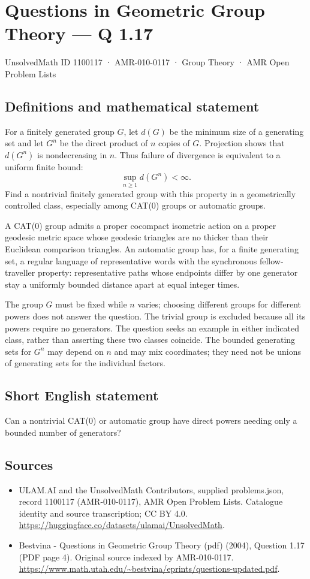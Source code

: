 \documentclass[11pt,a4paper]{article}
\begin{document}
\section*{Questions in Geometric Group Theory — Q 1.17}\label{1100117}
{\small UnsolvedMath ID 1100117 · AMR-010-0117 · Group Theory · AMR Open Problem Lists}
\subsection{Definitions and mathematical statement}
For a finitely generated group $G$, let $d(G)$ be the minimum size of a generating set and let $G^n$ be the direct product of $n$ copies of $G$. Projection shows that $d(G^n)$ is nondecreasing in $n$. Thus failure of divergence is equivalent to a uniform finite bound:
\[
 \sup_{n\geq1}d(G^n)<\infty.
\]
Find a nontrivial finitely generated group with this property in a geometrically controlled class, especially among CAT(0) groups or automatic groups.

A CAT(0) group admits a proper cocompact isometric action on a proper geodesic metric space whose geodesic triangles are no thicker than their Euclidean comparison triangles. An automatic group has, for a finite generating set, a regular language of representative words with the synchronous fellow-traveller property: representative paths whose endpoints differ by one generator stay a uniformly bounded distance apart at equal integer times.

The group $G$ must be fixed while $n$ varies; choosing different groups for different powers does not answer the question. The trivial group is excluded because all its powers require no generators. The question seeks an example in either indicated class, rather than asserting these two classes coincide. The bounded generating sets for $G^n$ may depend on $n$ and may mix coordinates; they need not be unions of generating sets for the individual factors.
\subsection{Short English statement}
Can a nontrivial CAT(0) or automatic group have direct powers needing only a bounded number of generators?
\subsection{Sources}
\begin{itemize}
\item[S1] ULAM.AI and the UnsolvedMath Contributors, supplied problems.json, record 1100117 (AMR-010-0117), AMR Open Problem Lists. Catalogue identity and source transcription; CC BY 4.0.
\url{https://huggingface.co/datasets/ulamai/UnsolvedMath}.
\item[S2] Bestvina - Questions in Geometric Group Theory (pdf) (2004), Question 1.17 (PDF page 4). Original source indexed by AMR-010-0117.
\url{https://www.math.utah.edu/~bestvina/eprints/questions-updated.pdf}.
\end{itemize}
\end{document}
